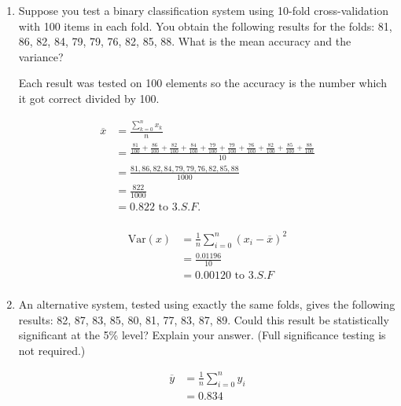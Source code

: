 \documentclass[10pt,\jkfside,a4paper]{article}
\begin{document}
\begin{enumerate}

\item Suppose you test a binary classification system using 10-fold cross-validation
with 100 items in each fold. You obtain the following results for the folds:
81, 86, 82, 84, 79, 79, 76, 82, 85, 88. What is the mean accuracy and the
variance?

Each result was tested on 100 elements so the accuracy is the number which it got correct divided 
by 100.

\begin{equation}
\begin{split}
\overline{x} &= \frac{\sum^n_{k = 0} x_k}{n} \\
			 &= \frac{\frac{81}{100} + \frac{86}{100} + \frac{82}{100} + \frac{84}{100} + \frac{79}{100} + \frac{79}{100} + \frac{76}{100} + \frac{82}{100} + \frac{85}{100} + \frac{88}{100}}{10} \\
			 &= \frac{81, 86, 82, 84, 79, 79, 76, 82, 85, 88}{1000} \\
			 &= \frac{822}{1000} \\
			 &= 0.822 \text{ to } 3.S.F. \\
\end{split}
\end{equation}

\begin{equation}
\begin{split}
\text{Var}(x) &= \frac{1}{n}\sum^{n}_{i=0}(x_i - \overline{x})^2 \\
			  &= \frac{0.01196}{10} \\
			  &= 0.00120 \text{ to } 3.S.F \\
\end{split}
\end{equation}

\item An alternative system, tested using exactly the same folds, gives the
following results: 82, 87, 83, 85, 80, 81, 77, 83, 87, 89. Could this result
be statistically significant at the 5\% level? Explain your answer. (Full
significance testing is not required.)

\begin{equation}
\begin{split}
\overline{y} &= \frac{1}{n} \sum^n_{i=0}y_i \\
			 &= 0.834 \\
\end{split}
\end{equation}


\end{enumerate}
\end{document}
